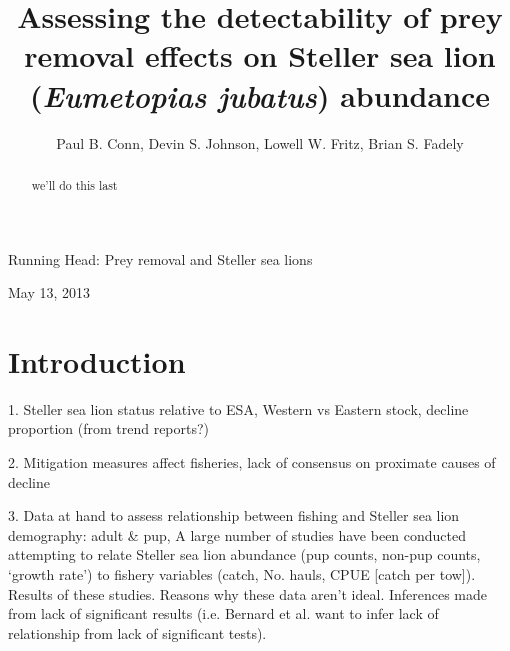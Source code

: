 \documentclass[nonumbib,leqno]{nrc1}
\begin{document}
\title{Assessing the detectability of prey removal effects on Steller sea lion ({\it Eumetopias jubatus}) abundance}

\author[P. B. Conn, D. S. Johnson, L. W. Fritz, B. S. Fadely]{Paul B. Conn, Devin S. Johnson, Lowell W. Fritz, Brian S. Fadely}
\address{National Marine Mammal Laboratory, Alaska Fisheries Science Center,
NOAA National Marine Fisheries Service,
Seattle, Washington, U.S.A. 98115}

\large

\maketitle

{\sc Running Head}: Prey removal and Steller sea lions \bigskip

May 13, 2013



\clearpage

\linenumbers


\begin{abstract}
\large
we'll do this last
\end{abstract}




\clearpage

\renewcommand{\baselinestretch}{1.8}\normalsize


\section{Introduction}

1. Steller sea lion status relative to ESA, Western vs Eastern stock, decline proportion (from trend reports?)

2. Mitigation measures affect fisheries, lack of consensus on proximate causes of decline

3. Data at hand to assess relationship between fishing and Steller sea lion demography: adult \& pup,
A large number of studies have been conducted attempting to relate Steller sea lion abundance (pup counts, non-pup counts, `growth rate') to fishery variables (catch, No. hauls, CPUE [catch per tow]).  Results of these studies. Reasons why these data aren't ideal.  Inferences made from lack of significant results (i.e. Bernard et al. want to infer lack of relationship from lack of significant tests).
\end{document}
